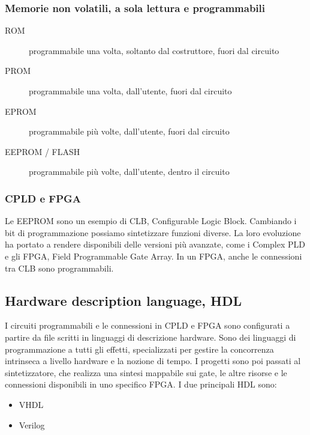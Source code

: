 \documentclass{article}
\begin{document}
\subsubsection{Memorie non volatili, a sola lettura e programmabili}

\begin{description}
    \item[ROM] programmabile una volta, soltanto dal costruttore, fuori dal circuito
    \item[PROM] programmabile una volta, dall'utente, fuori dal circuito
    \item[EPROM] programmabile più volte, dall'utente, fuori dal circuito
    \item[EEPROM / FLASH] programmabile più volte, dall'utente, dentro il circuito
\end{description}

\subsubsection{CPLD e FPGA}

Le EEPROM sono un esempio di CLB, Configurable Logic Block.
Cambiando i bit di programmazione possiamo sintetizzare funzioni diverse.
La loro evoluzione ha portato a rendere disponibili delle versioni più avanzate, come i Complex PLD e gli FPGA, Field Programmable Gate Array.
In un FPGA, anche le connessioni tra CLB sono programmabili.

\subsection{Hardware description language, HDL}

I circuiti programmabili e le connessioni in CPLD e FPGA sono configurati a partire da file scritti in linguaggi di descrizione hardware.
Sono dei linguaggi di programmazione a tutti gli effetti, specializzati per gestire la concorrenza intrinseca a livello hardware e la nozione di tempo.
I progetti sono poi passati al sintetizzatore, che realizza una sintesi mappabile sui gate, le altre risorse e le connessioni disponibili in uno specifico FPGA.
I due principali HDL sono:

\begin{itemize}
    \item VHDL
    \item Verilog
\end{itemize}
\end{document}
